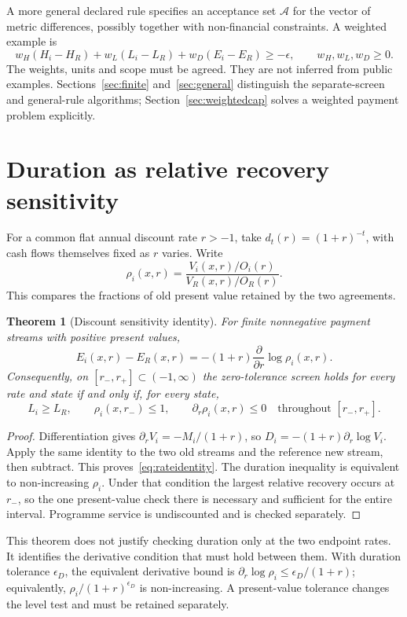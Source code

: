\documentclass[11pt,a4paper]{article}
\newtheorem{theorem}{Theorem}[section]
\begin{document}
A more general declared rule specifies an acceptance set $\mathcal A$ for the vector of metric differences, possibly together with non-financial constraints. A weighted example is
\begin{equation}\label{eq:weighted}
 w_H(H_i-H_R)+w_L(L_i-L_R)+w_D(E_i-E_R)\geq-\epsilon,
 \qquad w_H,w_L,w_D\geq0.
\end{equation}
The weights, units and scope must be agreed. They are not inferred from public examples. Sections~\ref{sec:finite} and~\ref{sec:general} distinguish the separate-screen and general-rule algorithms; Section~\ref{sec:weightedcap} solves a weighted payment problem explicitly.

\section{Duration as relative recovery sensitivity}\label{sec:rates}
For a common flat annual discount rate $r>-1$, take $d_t(r)=(1+r)^{-t}$, with cash flows themselves fixed as $r$ varies. Write
\begin{equation}
 \rho_i(x,r)=\frac{V_i(x,r)/O_i(r)}{V_R(x,r)/O_R(r)}.
\end{equation}
This compares the fractions of old present value retained by the two agreements.

\begin{theorem}[Discount sensitivity identity]\label{thm:rate}
For finite nonnegative payment streams with positive present values,
\begin{equation}\label{eq:rateidentity}
 E_i(x,r)-E_R(x,r)=-(1+r)\frac{\partial}{\partial r}\log\rho_i(x,r).
\end{equation}
Consequently, on $[r_-,r_+]\subset(-1,\infty)$ the zero-tolerance screen holds for every rate and state if and only if, for every state,
\begin{equation}\label{eq:rateconditions}
 L_i\geq L_R,\qquad \rho_i(x,r_-)\leq1,\qquad
 \partial_r\rho_i(x,r)\leq0\quad\text{throughout }[r_-,r_+].
\end{equation}
\end{theorem}
\begin{proof}
Differentiation gives $\partial_r V_i=-M_i/(1+r)$, so
$D_i=-(1+r)\partial_r\log V_i$. Apply the same identity to the two old streams and the reference new stream, then subtract. This proves~\eqref{eq:rateidentity}. The duration inequality is equivalent to non-increasing $\rho_i$. Under that condition the largest relative recovery occurs at $r_-$, so the one present-value check there is necessary and sufficient for the entire interval. Programme service is undiscounted and is checked separately.
\end{proof}
This theorem does not justify checking duration only at the two endpoint rates. It identifies the derivative condition that must hold between them. With duration tolerance $\epsilon_D$, the equivalent derivative bound is
$\partial_r\log\rho_i\leq\epsilon_D/(1+r)$; equivalently, $\rho_i/(1+r)^{\epsilon_D}$ is non-increasing. A present-value tolerance changes the level test and must be retained separately.
\end{document}
